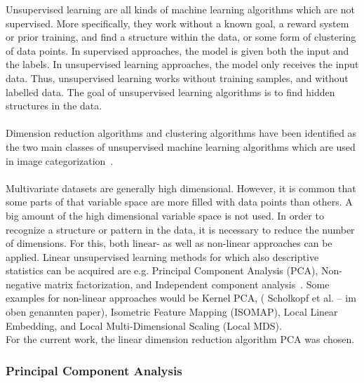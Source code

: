 Unsupervised learning are all kinds of machine learning algorithms which are not supervised. More specifically, they work without a known goal, a reward system or prior training, and find a structure within the data, or some form of clustering of data points. In supervised approaches, the model is given both the input and the labels. In unsupervised learning approaches, the model only receives the input data. Thus, unsupervised learning works without training samples, and without labelled data. The goal of unsupervised learning algorithms is to find hidden structures in the data.  \\
\\
Dimension reduction algorithms and clustering algorithms have been identified as the two main classes of unsupervised machine learning algorithms which are used in image categorization~\citep{olaode2014}. \\
\\
Multivariate datasets are generally high dimensional. However, it is common that some parts of that variable space are more filled with data points than others. A big amount of the high dimensional variable space is not used. In order to recognize a structure or pattern in the data, it is necessary to reduce the number of dimensions. For this, both linear- as well as non-linear approaches can be applied. Linear unsupervised learning methods for which also descriptive statistics can be acquired are e.g. Principal Component Analysis (PCA), Non-negative matrix factorization, and Independent component analysis~\citep{olaode2014}. Some examples for non-linear approaches would be Kernel PCA,  ( Scholkopf  et  al. – im oben genannten paper),  Isometric  Feature  Mapping  (ISOMAP),  Local  Linear  Embedding,  and Local  Multi-Dimensional  Scaling  (Local  MDS). \\
For the current work, the linear dimension reduction algorithm PCA was chosen.


\subsubsection{Principal Component Analysis}
\label{subsec:PCA}

